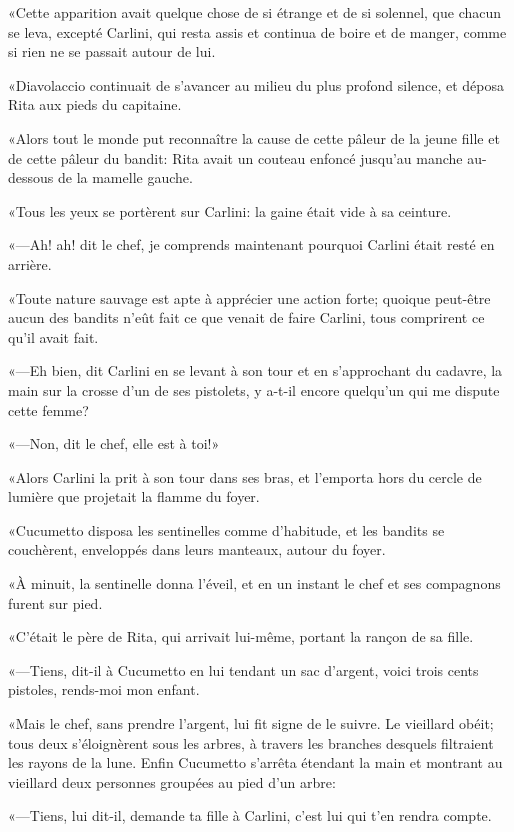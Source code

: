 «Cette apparition avait quelque chose de si étrange et de si solennel, que chacun se leva, excepté Carlini, qui resta assis et continua de boire et de manger, comme si rien ne se passait autour de lui. 

«Diavolaccio continuait de s'avancer au milieu du plus profond silence, et déposa Rita aux pieds du capitaine. 

«Alors tout le monde put reconnaître la cause de cette pâleur de la jeune fille et de cette pâleur du bandit: Rita avait un couteau enfoncé jusqu'au manche au-dessous de la mamelle gauche. 

«Tous les yeux se portèrent sur Carlini: la gaine était vide à sa ceinture. 

«—Ah! ah! dit le chef, je comprends maintenant pourquoi Carlini était resté en arrière. 

«Toute nature sauvage est apte à apprécier une action forte; quoique peut-être aucun des bandits n'eût fait ce que venait de faire Carlini, tous comprirent ce qu'il avait fait. 

«—Eh bien, dit Carlini en se levant à son tour et en s'approchant du cadavre, la main sur la crosse d'un de ses pistolets, y a-t-il encore quelqu'un qui me dispute cette femme? 

«—Non, dit le chef, elle est à toi!» 

«Alors Carlini la prit à son tour dans ses bras, et l'emporta hors du cercle de lumière que projetait la flamme du foyer. 

«Cucumetto disposa les sentinelles comme d'habitude, et les bandits se couchèrent, enveloppés dans leurs manteaux, autour du foyer. 

«À minuit, la sentinelle donna l'éveil, et en un instant le chef et ses compagnons furent sur pied. 

«C'était le père de Rita, qui arrivait lui-même, portant la rançon de sa fille.  

«—Tiens, dit-il à Cucumetto en lui tendant un sac d'argent, voici trois cents pistoles, rends-moi mon enfant. 

«Mais le chef, sans prendre l'argent, lui fit signe de le suivre. Le vieillard obéit; tous deux s'éloignèrent sous les arbres, à travers les branches desquels filtraient les rayons de la lune. Enfin Cucumetto s'arrêta étendant la main et montrant au vieillard deux personnes groupées au pied d'un arbre: 

«—Tiens, lui dit-il, demande ta fille à Carlini, c'est lui qui t'en rendra compte. 

